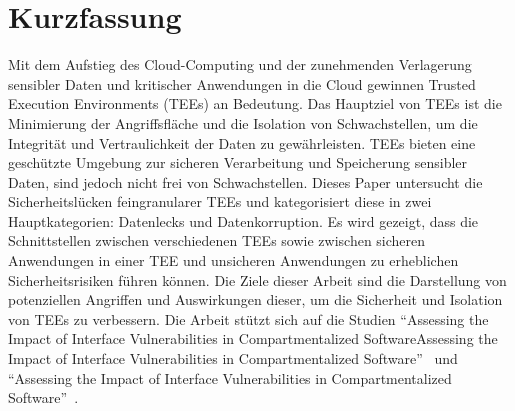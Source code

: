 \section*{Kurzfassung}
Mit dem Aufstieg des Cloud-Computing und der zunehmenden Verlagerung sensibler Daten und kritischer Anwendungen in die Cloud gewinnen Trusted Execution Environments (TEEs) an Bedeutung. Das Hauptziel von TEEs ist die Minimierung der Angriffsfläche und die Isolation von Schwachstellen, um die Integrität und Vertraulichkeit der Daten zu gewährleisten. TEEs bieten eine geschützte Umgebung zur sicheren Verarbeitung und Speicherung sensibler Daten, sind jedoch nicht frei von Schwachstellen. 
Dieses Paper untersucht die Sicherheitslücken feingranularer TEEs und kategorisiert diese in zwei Hauptkategorien: Datenlecks und Datenkorruption. Es wird gezeigt, dass die Schnittstellen zwischen verschiedenen TEEs sowie zwischen sicheren Anwendungen in einer TEE und unsicheren Anwendungen zu erheblichen Sicherheitsrisiken führen können.
Die Ziele dieser Arbeit sind die Darstellung von potenziellen Angriffen und Auswirkungen dieser, um die Sicherheit und Isolation von TEEs zu verbessern. Die Arbeit stützt sich auf die Studien \enquote{Assessing the Impact of Interface Vulnerabilities in Compartmentalized SoftwareAssessing the Impact of Interface Vulnerabilities in Compartmentalized Software}~\cite{CIVPaper} und \enquote{Assessing the Impact of Interface Vulnerabilities in Compartmentalized Software}~\cite{TEEPaper}.